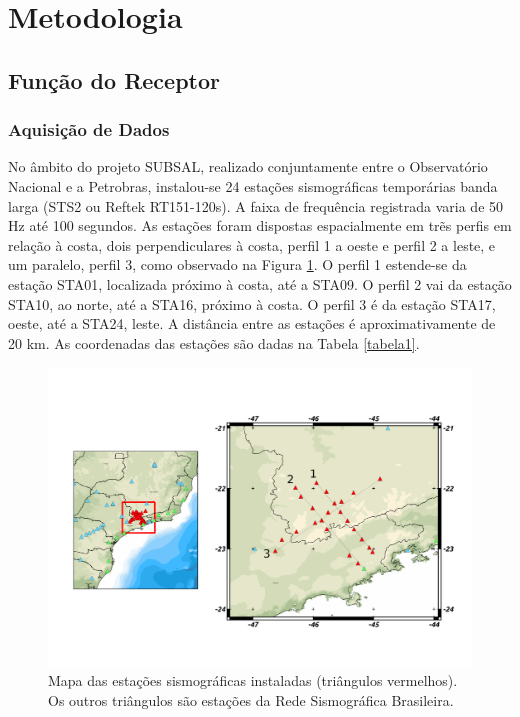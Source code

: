 \chapter*{Metodologia}

\section*{Função do Receptor}
\subsection*{Aquisição de Dados}

No âmbito do projeto SUBSAL, realizado conjuntamente entre o Observatório Nacional e a Petrobras,  instalou-se 24 estações sismográficas temporárias banda larga (STS2 ou Reftek RT151-120s). A faixa de frequência registrada varia de 50 Hz até 100 segundos.  As estações foram dispostas espacialmente em trẽs perfis em relação à costa, dois perpendiculares à costa, perfil 1 a oeste e perfil 2 a leste, e um paralelo, perfil 3, como observado na Figura \ref{map_loc}. O perfil 1 estende-se da estação STA01, localizada próximo à costa, até a STA09. O perfil 2 vai da estação STA10, ao norte, até a STA16, próximo à costa. O perfil 3 é da estação STA17, oeste, até a STA24, leste. A distância entre as estações é aproximativamente de 20 km. As coordenadas das estações são dadas na Tabela \ref{tabela1}. 

\begin{figure}[!ht]
\centering
\includegraphics[scale=0.4]{mapa_das_estacoes_simosgraficas_instaladas.png}
\caption{Mapa das estações sismográficas instaladas (triângulos vermelhos). Os outros triângulos são estações da Rede Sismográfica Brasileira.}
\label{map_loc}
\end{figure}

